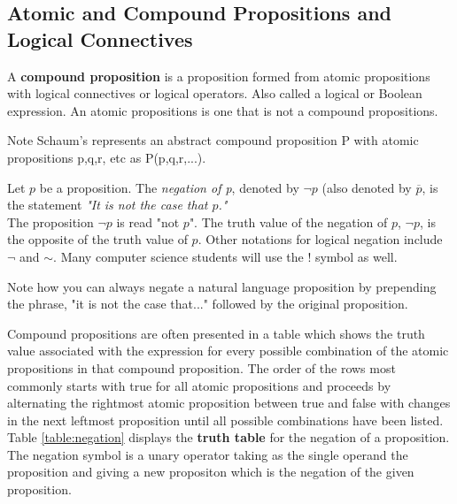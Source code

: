 \subsection{Atomic and Compound Propositions and Logical Connectives}
\begin {definition}
A \textbf{compound proposition} is a proposition formed from atomic propositions with logical connectives or logical operators. Also called a logical or Boolean expression. An atomic propositions is one that is not a compound propositions.
\end {definition}

Note Schaum's represents an abstract compound proposition P with atomic propositions p,q,r, etc as P(p,q,r,...).

\begin {definition}[Negation]
Let $p$ be a proposition. The \textit{negation of p}, denoted by $\lnot p$ (also denoted by $\overline{p}$, is the statement 
\textit{"It is not the case that $p$."}\\
The proposition $\lnot p$ is read "not $p$". The truth value of the negation of $p$,  $\lnot p$, is the opposite of the truth value of $p$. Other notations for logical negation include $\neg$ and $\sim$. Many computer science students will use the ! symbol as well.
\end {definition} 

Note how you can always negate a natural language proposition by prepending the phrase, "it is not the case that..." followed by the original proposition.

\begin{definition}
Compound propositions are often presented in a table which shows the truth value associated with the expression for every possible combination of the atomic propositions in that compound proposition. The order of the rows most commonly starts with true for all atomic propositions and proceeds by alternating the rightmost atomic proposition between true and false with changes in the next leftmost proposition until all possible combinations have been listed. Table \ref{table:negation} displays the \textbf{truth table} for the negation of a proposition. The negation symbol is a unary operator taking as the single operand the proposition and giving a new propositon which is the negation of the given proposition. 
\end{definition}
    
